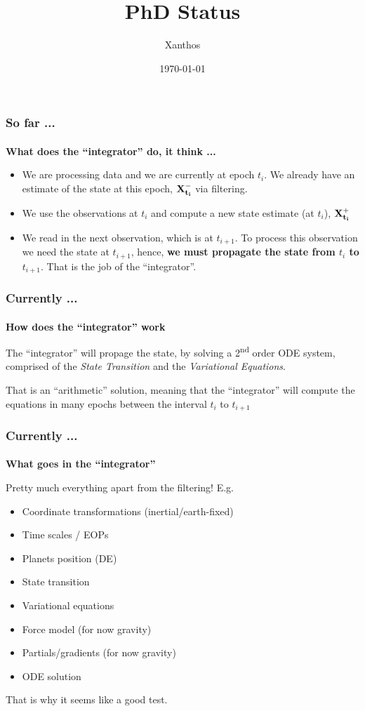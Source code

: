 \documentclass{beamer}
\title[]{PhD Status}
\author{Xanthos}
\institute{DSO \& IGN}
\date{\today}
\newcommand{\bitem}{\item[\textbullet]}
\begin{document}
\begin{frame}
  \titlepage
\end{frame}

\begin{frame}\frametitle{So far ...}\framesubtitle{}
  \textbf{What does the ``integrator'' do, it think ...}
  \medskip

  \begin{itemize}
    \bitem We are processing data and we are currently at epoch $t_i$. We 
    already have an estimate of the state at this epoch, $\bf{X}_{t_i}^-$ via 
    filtering.
    \bitem We use the observations at $t_i$ and compute a new state estimate
    (at $t_i$), $\bf{X}_{t_i}^+$
    \bitem We read in the next observation, which is at $t_{i+1}$. To process 
    this observation we need the state at $t_{i+1}$, hence, \textbf{we must 
    propagate the state from $t_i$ to $t_{i+1}$}. That is the job of the 
    ``integrator''.
  \end{itemize}
\end{frame}

\begin{frame}\frametitle{Currently ...}\framesubtitle{}
    \textbf{How does the ``integrator'' work}
    \medskip 

    The ``integrator'' will propage the state, by solving a 2\textsuperscript{nd} 
    order ODE system, comprised of the \emph{State Transition} and the 
    \emph{Variational Equations}.

    \smallskip
    That is an ``arithmetic'' solution, meaning that the ``integrator'' will 
    compute the equations in many epochs between the interval $t_i$ to 
    $t_{i+1}$

\end{frame}

\begin{frame}\frametitle{Currently ...}\framesubtitle{}
    \textbf{What goes in the ``integrator''}
    \medskip
    
    Pretty much everything apart from the filtering! E.g.
    \begin{itemize}
        \bitem Coordinate transformations (inertial/earth-fixed)
        \bitem Time scales / EOPs
        \bitem Planets position (DE)
        \bitem State transition
        \bitem Variational equations
        \bitem Force model (for now gravity)
        \bitem Partials/gradients (for now gravity)
        \bitem ODE solution
    \end{itemize}

    \medskip
    That is why it seems like a good test.
\end{frame}
\end{document}
